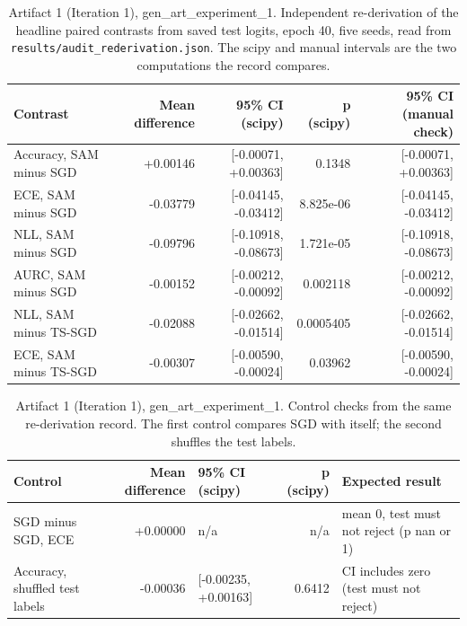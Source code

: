 \documentclass[11pt,letterpaper]{article}
\begin{document}
\begin{table}[!htbp]
\centering
\scriptsize
\caption{Artifact 1 (Iteration 1), gen\_art\_experiment\_1. Independent re-derivation of the headline paired contrasts from saved test logits, epoch 40, five seeds, read from \texttt{results/audit\_rederivation.json}. The scipy and manual intervals are the two computations the record compares.}
\label{tab:audit1}
\begin{tabular}{lrrrr}
\toprule
Contrast & Mean difference & 95\% CI (scipy) & p (scipy) & 95\% CI (manual check) \\
\midrule
Accuracy, SAM minus SGD & +0.00146 & [-0.00071, +0.00363] & 0.1348 & [-0.00071, +0.00363] \\
ECE, SAM minus SGD & -0.03779 & [-0.04145, -0.03412] & 8.825e-06 & [-0.04145, -0.03412] \\
NLL, SAM minus SGD & -0.09796 & [-0.10918, -0.08673] & 1.721e-05 & [-0.10918, -0.08673] \\
AURC, SAM minus SGD & -0.00152 & [-0.00212, -0.00092] & 0.002118 & [-0.00212, -0.00092] \\
NLL, SAM minus TS-SGD & -0.02088 & [-0.02662, -0.01514] & 0.0005405 & [-0.02662, -0.01514] \\
ECE, SAM minus TS-SGD & -0.00307 & [-0.00590, -0.00024] & 0.03962 & [-0.00590, -0.00024] \\
\bottomrule
\end{tabular}
\end{table}
\begin{table}[!htbp]
\centering
\footnotesize
\caption{Artifact 1 (Iteration 1), gen\_art\_experiment\_1. Control checks from the same re-derivation record. The first control compares SGD with itself; the second shuffles the test labels.}
\label{tab:placebo1}
\begin{tabular}{p{3.6cm}rlrp{4.8cm}}
\toprule
Control & Mean difference & 95\% CI (scipy) & p (scipy) & Expected result \\
\midrule
SGD minus SGD, ECE & +0.00000 & n/a & n/a & mean 0, test must not reject (p nan or 1) \\
Accuracy, shuffled test labels & -0.00036 & [-0.00235, +0.00163] & 0.6412 & CI includes zero (test must not reject) \\
\bottomrule
\end{tabular}
\end{table}
\end{document}
